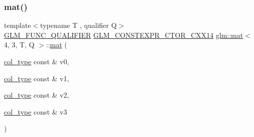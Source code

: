 \mbox{\label{structglm_1_1mat_3_014_00_013_00_01_t_00_01_q_01_4_a2cfd869481f07a3f48249a841dcc46af}} 
\subsubsection{\texorpdfstring{mat()}{mat()}\hspace{0.1cm}{\footnotesize\ttfamily [6/21]}}
{\footnotesize\ttfamily template$<$typename T , qualifier Q$>$ \\
\mbox{\hyperlink{setup_8hpp_a33fdea6f91c5f834105f7415e2a64407}{G\+L\+M\+\_\+\+F\+U\+N\+C\+\_\+\+Q\+U\+A\+L\+I\+F\+I\+ER}} \mbox{\hyperlink{setup_8hpp_a0900f9145e68bf6061b6f5e7be3fa751}{G\+L\+M\+\_\+\+C\+O\+N\+S\+T\+E\+X\+P\+R\+\_\+\+C\+T\+O\+R\+\_\+\+C\+X\+X14}} \mbox{\hyperlink{structglm_1_1mat}{glm\+::mat}}$<$ 4, 3, T, Q $>$\+::\mbox{\hyperlink{structglm_1_1mat}{mat}} (\begin{DoxyParamCaption}\item[{\mbox{\hyperlink{structglm_1_1mat_3_014_00_013_00_01_t_00_01_q_01_4_ab7cb76d6290691108c8af724270e3b6c}{col\+\_\+type}} const \&}]{v0,  }\item[{\mbox{\hyperlink{structglm_1_1mat_3_014_00_013_00_01_t_00_01_q_01_4_ab7cb76d6290691108c8af724270e3b6c}{col\+\_\+type}} const \&}]{v1,  }\item[{\mbox{\hyperlink{structglm_1_1mat_3_014_00_013_00_01_t_00_01_q_01_4_ab7cb76d6290691108c8af724270e3b6c}{col\+\_\+type}} const \&}]{v2,  }\item[{\mbox{\hyperlink{structglm_1_1mat_3_014_00_013_00_01_t_00_01_q_01_4_ab7cb76d6290691108c8af724270e3b6c}{col\+\_\+type}} const \&}]{v3 }\end{DoxyParamCaption})}

\mbox{\label{structglm_1_1mat_3_014_00_013_00_01_t_00_01_q_01_4_a7ced48f5154c33ac14f3af5771e73446}} 
